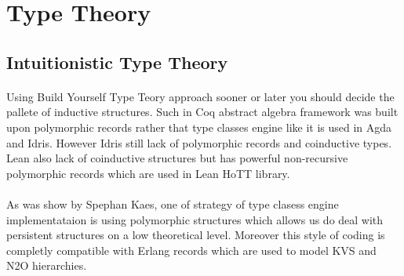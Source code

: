 \documentclass[11pt,oneside]{article}
\begin{document}
\begingroup
\parbox[t][][l]{0.40\textwidth}{

\begin{prooftree}
\end{prooftree}

\begin{prooftree}
\end{prooftree}

}
\hspace{0.1cm}
\parbox[t][][r]{0.60\textwidth}{


\begin{prooftree}
\end{prooftree}

}
\endgroup

\newpage
\section{Type Theory}

   \subsection{Intuitionistic Type Theory}

   \paragraph{}
   Using Build Yourself Type Teory approach sooner or later
   you should decide the pallete of inductive structures. Such in Coq
   abstract algebra framework was built upon polymorphic records\cite{coqalg} rather
   that type classes engine like it is used in Agda and Idris. However
   Idris still lack of polymorphic records and coinductive types. Lean also
   lack of coinductive structures but has powerful non-recursive polymorphic records
   which are used in Lean HoTT library.

   \paragraph{}
   As was show by Spephan Kaes\cite{kaes}, one of strategy of type clasess engine
   implementataion is using polymorphic structures which allows us do deal with
   persistent structures on a low theoretical level. Moreover this style of coding
   is completly compatible with Erlang records which are used to model KVS and N2O hierarchies.
\end{document}
